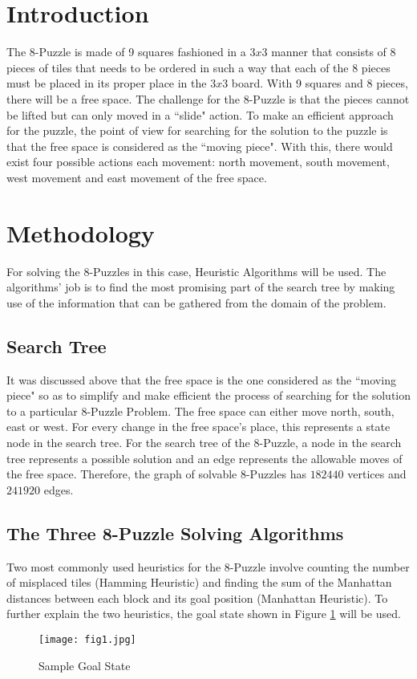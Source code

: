 \section{Introduction}
	The 8-Puzzle is made of 9 squares fashioned in a $3x3$ manner that consists of 8 pieces of tiles that needs to be ordered in such a way that each of the 8 pieces must be placed in its proper place in the $3x3$ board. With 9 squares and 8 pieces, there will be a free space. The challenge for the 8-Puzzle is that the pieces cannot be lifted but can only moved in a ``slide" action. To make an efficient approach for the puzzle, the point of view for searching for the solution to the puzzle is that the free space is considered as the ``moving piece". With this, there would exist four possible actions each movement: north movement, south movement, west movement and east movement of the free space. \cite{back1}

\section{Methodology}
	For solving the 8-Puzzles in this case, Heuristic Algorithms will be used. The algorithms' job is to find the most promising part of the search tree by making use of the information that can be gathered from the domain of the problem.

	\subsection{Search Tree}
		It was discussed above that the free space is the one considered as the ``moving piece" so as to simplify and make efficient the process of searching for the solution to a particular 8-Puzzle Problem. The free space can either move north, south, east or west. For every change in the free space's place, this represents a state node in the search tree. For the search tree of the 8-Puzzle, a node in the search tree represents a possible solution and an edge represents the allowable moves of the free space. Therefore, the graph of solvable 8-Puzzles has $182440$ vertices and $241920$ edges. \cite{back2}
	
	\subsection{The Three 8-Puzzle Solving Algorithms}
		Two most commonly used heuristics for the 8-Puzzle involve counting the number of misplaced tiles (Hamming Heuristic) and finding the sum of the Manhattan distances between each block and its goal position (Manhattan Heuristic). To further explain the two heuristics, the goal state shown in Figure \ref{fig:gs} will be used.
		\begin{figure}[h]
		\centering
		\texttt{[image: fig1.jpg]}
		\caption{Sample Goal State}
		\label{fig:gs}
		\end{figure}

